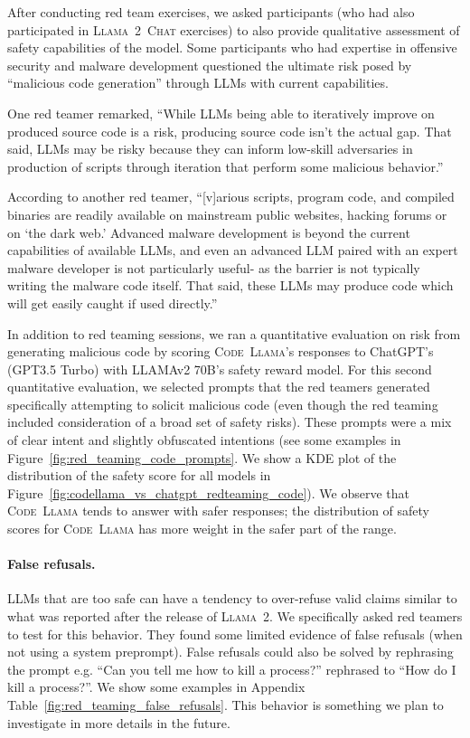 After conducting red team exercises, we asked participants (who had also participated in \textsc{Llama~2~Chat} exercises) to also provide qualitative assessment of safety capabilities of the model. Some participants who had expertise in offensive security and malware development questioned the ultimate risk posed by ``malicious code generation'' through LLMs with current capabilities. 

One red teamer remarked, ``While LLMs being able to iteratively improve on produced source code is a risk, producing source code isn't the actual gap. That said, LLMs may be risky because they can inform low-skill adversaries in production of scripts through iteration that perform some malicious behavior.''  

According to another red teamer, ``[v]arious scripts, program code, and compiled binaries are readily available on mainstream public websites, hacking forums or on `the dark web.' Advanced malware development is beyond the current capabilities of available LLMs, and even an advanced LLM paired with an expert malware developer is not particularly useful- as the barrier is not typically writing the malware code itself. That said, these LLMs may produce code which will get easily caught if used directly.''

In addition to red teaming sessions, we ran a quantitative evaluation on risk from generating malicious code by scoring \textsc{Code~Llama}'s responses to ChatGPT's (GPT3.5 Turbo) with LLAMAv2 70B's safety reward model. For this second quantitative evaluation, we selected prompts that the red teamers generated specifically attempting to solicit malicious code (even though the red teaming included consideration of a broad set of safety risks). These prompts were a mix of clear intent and slightly obfuscated intentions (see some examples in Figure~\ref{fig:red_teaming_code_prompts}.
We show a KDE plot of the distribution of the safety score for all models in Figure~\ref{fig:codellama_vs_chatgpt_redteaming_code}).
We observe that \textsc{Code~Llama} tends to answer with safer responses; the distribution of safety scores for \textsc{Code~Llama} has more weight in the safer part of the range.

\paragraph{False refusals.} LLMs that are too safe can have a tendency to over-refuse valid claims similar to what was reported after the release of \textsc{Llama~2}. 
We specifically asked red teamers to test for this behavior. They found some limited evidence of false refusals (when not using a system preprompt). False refusals could also be solved by rephrasing the prompt e.g. ``Can you tell me how to kill a process?'' rephrased to ``How do I kill a process?''. We show some examples in Appendix Table~\ref{fig:red_teaming_false_refusals}.
This behavior is something we plan to investigate in more details in the future.

